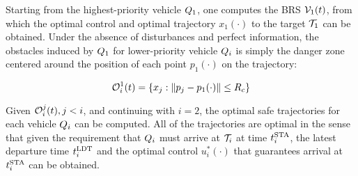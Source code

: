 Starting from the highest-priority vehicle $Q_1$, one computes the BRS $\mathcal{V}_1(t)$, from which the optimal control and optimal trajectory $x_1(\cdot)$ to the target $\mathcal{T}_1$ can be obtained. Under the absence of disturbances and perfect information, the obstacles induced by $Q_1$ for lower-priority vehicle $Q_i$ is simply the danger zone centered around the position of each point $p_1(\cdot)$ on the trajectory:

\begin{equation}
\mathcal{O}_i^1(t) = \{x_j: \|p_j - p_1(\cdot)\|\le R_c\}
\end{equation}

Given $\mathcal{O}_i^j(t), j<i$, and continuing with $i = 2$, the optimal safe trajectories for each vehicle $Q_i$ can be computed. All of the trajectories are optimal in the sense that given the requirement that $Q_i$ must arrive at $\mathcal{T}_i$ at time $t^\text{STA}_i$, the latest departure time $t^\text{LDT}_i$ and the optimal control $u^*_i(\cdot)$ that guarantees arrival at $t^\text{STA}_i$ can be obtained.